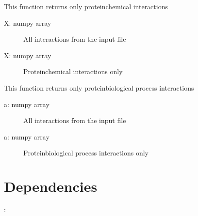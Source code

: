 \documentclass[a4paper,10pt,english]{sphinxmanual}
\begin{document}

\begin{fulllineitems}
\label{\detokenize{run_FLUTE:run_FLUTE.getChem}}
\sphinxAtStartPar
This function returns only protein\sphinxhyphen{}chemical interactions
\begin{description}
\item[{X: numpy array}] \leavevmode
\sphinxAtStartPar
All interactions from the input file

\end{description}
\begin{description}
\item[{X: numpy array}] \leavevmode
\sphinxAtStartPar
Protein\sphinxhyphen{}chemical interactions only

\end{description}

\end{fulllineitems}


\begin{fulllineitems}
\label{\detokenize{run_FLUTE:run_FLUTE.getGo}}
\sphinxAtStartPar
This function returns only protein\sphinxhyphen{}biological process interactions
\begin{description}
\item[{a: numpy array}] \leavevmode
\sphinxAtStartPar
All interactions from the input file

\end{description}
\begin{description}
\item[{a: numpy array}] \leavevmode
\sphinxAtStartPar
Protein\sphinxhyphen{}biological process interactions only

\end{description}

\end{fulllineitems}



\section{Dependencies}
\label{\detokenize{run_FLUTE:dependencies}}
\sphinxAtStartPar
{}:
\end{document}
